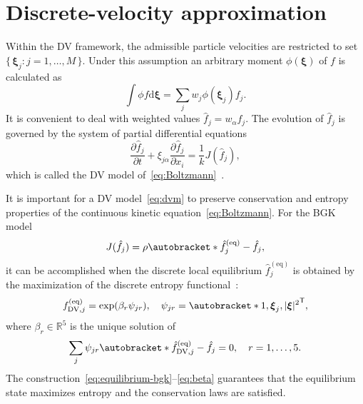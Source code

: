 \documentclass[]{elsarticle} %
\newcommand{\dd}{\mathrm{d}}
\newcommand{\pder}[2][]{\frac{\partial#1}{\partial#2}}
\newcommand{\Set}[2]{\{\,{#1}:{#2}\,\}}
\newcommand{\transpose}[1]{#1^\mathsf{T}}
\DeclarePairedDelimiter\autobracket()       %
\newcommand{\br}[1]{\autobracket*{#1}}
\newcommand{\dxi}{\dd{\boldsymbol{\xi}}}
\newcommand{\bxi}{\boldsymbol{\xi}}
\newcommand{\equil}[1]{#1^\mathrm{(eq)}}
\newcommand{\DV}{\mathrm{DV}}
\newcommand{\xiai}{\xi_{j \alpha}}
\begin{document}
\section{Discrete-velocity approximation}\label{sec:dv}

Within the DV framework, the admissible particle velocities are restricted to set \(\Set{\bxi_j}{j=1,\dots,M}\).
Under this assumption an arbitrary moment \(\phi(\bxi)\) of \(f\) is calculated as
\begin{equation}\label{eq:cubature}
    \int \phi f\dxi = \sum_j w_j \phi(\bxi_j) f_j.
\end{equation}
It is convenient to deal with weighted values \(\hat{f}_j = w_\alpha f_j\).
The evolution of \(\hat{f}_j\) is governed by the system of partial differential equations
\begin{equation}\label{eq:dvm}
    \pder[\hat{f}_j]{t} + \xiai\pder[\hat{f}_j]{x_i} = \frac1kJ(\hat{f}_j),
\end{equation}
which is called the DV model of~\eqref{eq:Boltzmann}~\cite{Cabannes1980}.

It is important for a DV model~\eqref{eq:dvm} to preserve conservation and entropy properties
of the continuous kinetic equation~\eqref{eq:Boltzmann}.
For the BGK model
\begin{equation}\label{eq:dvm-bgk}
    J(\hat{f}_j) = \rho\br{\equil{\hat{f}}_j-\hat{f}_j},
\end{equation}
it can be accomplished when the discrete local equilibrium \(\equil{\hat{f}}_j\)
is obtained by the maximization of the discrete entropy functional~\cite{Mieussens2000}:
\begin{equation}\label{eq:equilibrium-bgk}
    \equil{f}_{\DV,j} = \exp(\beta_r\psi_{jr}), \quad \psi_{jr} = \transpose{\br{1,\bxi_j,|\bxi|^2}},
\end{equation}
where \(\beta_r\in\mathbb{R}^5\) is the unique solution of
\begin{equation}\label{eq:beta}
    \sum_j\psi_{jr}\br{\equil{\hat{f}}_{\DV,j} - \hat{f}_j} = 0, \quad r = 1,\dots,5.
\end{equation}
The construction~\eqref{eq:equilibrium-bgk}--\eqref{eq:beta} guarantees that
the equilibrium state maximizes entropy and the conservation laws are satisfied.

\end{document}
